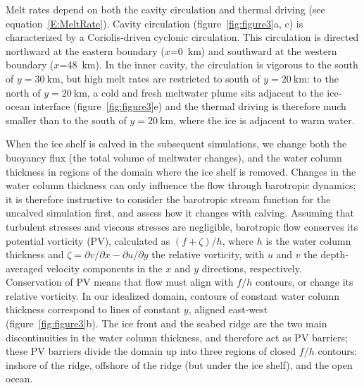 \documentclass[draft]{agujournal2019}
\begin{document}
Melt rates depend on both the cavity circulation and thermal driving (see equation~\eqref{E:MeltRate}). Cavity circulation (figure~\ref{fig:figure3}a, c) is characterized by a Coriolis-driven cyclonic circulation. This circulation is directed northward at the eastern boundary ($x$=0~km) and southward at the western boundary ($x$=48~km). In the inner cavity, the circulation is vigorous to the south of $y=30~\text{km}$, but high melt rates are restricted to south of $y=20~\text{km}$: to the north of $y=20~\text{km}$, a cold and fresh meltwater plume sits adjacent to the ice-ocean interface (figure~\ref{fig:figure3}e) and the thermal driving is therefore much smaller than to the south of $y=20~\text{km}$, where the ice is adjacent to warm water.


When the ice shelf is calved in the subsequent simulations, we change both the buoyancy flux (the total volume of meltwater changes), and the water column thickness in regions of the domain where the ice shelf is removed. Changes in the water column thickness can only influence the flow through barotropic dynamics; it is therefore instructive to consider the barotropic stream function for the uncalved simulation first, and assess how it changes with calving. Assuming that turbulent stresses and viscous stresses are negligible, barotropic flow conserves its potential vorticity (PV),  calculated as $(f + \zeta)/h$, where $h$ is the water column thickness and $\zeta = \partial v / \partial x - \partial u / \partial y$ the relative vorticity, with $u$ and $v$ the depth-averaged velocity components in the $x$ and $y$ directions, respectively. Conservation of PV means that flow must align with $f/h$ contours, or change its relative vorticity. In our idealized domain, contours of constant water column thickness correspond to lines of constant $y$, aligned east-west (figure~\ref{fig:figure3}b). The ice front and the seabed ridge are the two main discontinuities in the water column thickness, and therefore act as PV barriers; these PV barriers divide the domain up into three regions of closed $f/h$ contours: inshore of the ridge, offshore of the ridge (but under the ice shelf), and the open ocean.
\end{document}
